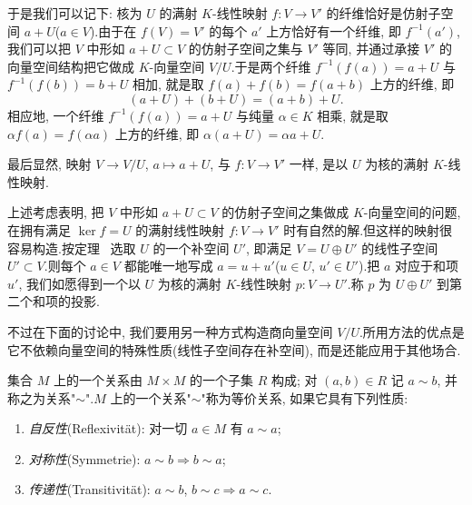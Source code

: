 于是我们可以记下: 核为 $U$ 的满射 $K$-线性映射 $f \colon V \longrightarrow V'$ 的纤维恰好是仿射子空间 $a + U$($a \in V$).由于在 $f(V) = V'$ 的每个 $a'$ 上方恰好有一个纤维, 即 $f^{-1}(a')$, 我们可以把 $V$ 中形如 $a + U \subset V$ 的仿射子空间之集与 $V'$ 等同, 并通过承接 $V'$ 的向量空间结构把它做成 $K$-向量空间 $V/U$.于是两个纤维 $f^{-1}(f(a)) = a + U$ 与 $f^{-1}(f(b)) = b + U$ 相加, 就是取 $f(a) + f(b) = f(a + b)$ 上方的纤维, 即
\[
(a + U) + (b + U) = (a + b) + U\text{.}
\]
相应地, 一个纤维 $f^{-1}(f(a)) = a + U$ 与纯量 $\alpha \in K$ 相乘, 就是取 $\alpha f(a) = f(\alpha a)$ 上方的纤维, 即 $\alpha(a + U) = \alpha a + U$.

最后显然, 映射 $V \longrightarrow V/U$, $a \longmapsto a + U$, 与 $f \colon V \longrightarrow V'$ 一样, 是以 $U$ 为核的满射 $K$-线性映射.

上述考虑表明, 把 $V$ 中形如 $a + U \subset V$ 的仿射子空间之集做成 $K$-向量空间的问题, 在拥有满足 $\ker f = U$ 的满射线性映射 $f \colon V \longrightarrow V'$ 时有自然的解.但这样的映射很容易构造.按定理~ 选取 $U$ 的一个补空间 $U'$, 即满足 $V = U \oplus U'$ 的线性子空间 $U' \subset V$.则每个 $a \in V$ 都能唯一地写成 $a = u + u'$($u \in U$, $u' \in U'$).把 $a$ 对应于和项 $u'$, 我们如愿得到一个以 $U$ 为核的满射 $K$-线性映射 $p \colon V \longrightarrow U'$.称 $p$ 为 $U \oplus U'$ 到第二个和项的投影.

不过在下面的讨论中, 我们要用另一种方式构造商向量空间 $V/U$.所用方法的优点是它不依赖向量空间的特殊性质(线性子空间存在补空间), 而是还能应用于其他场合.

\begin{definition}\label{def:2.2.3}
集合 $M$ 上的一个关系由 $M \times M$ 的一个子集 $R$ 构成; 对 $(a, b) \in R$ 记 $a \sim b$, 并称之为关系"$\sim$".$M$ 上的一个关系"$\sim$"称为等价关系, 如果它具有下列性质:
\begin{enumerate}
\item[(i)] \emph{自反性}(\textup{Reflexivität}): 对一切 $a \in M$ 有 $a \sim a$;
\item[(ii)] \emph{对称性}(\textup{Symmetrie}): $a \sim b \Longrightarrow b \sim a$;
\item[(iii)] \emph{传递性}(\textup{Transitivität}): $a \sim b$, $b \sim c \Longrightarrow a \sim c$.
\end{enumerate}
\end{definition}

